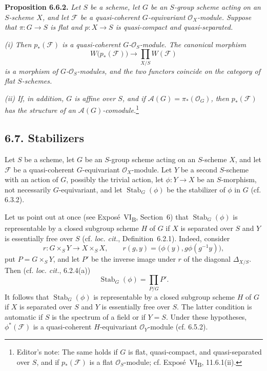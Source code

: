 \medskip
\noindent\textbf{Proposition 6.6.2.}
\textit{Let \(S\) be a scheme, let \(G\) be an \(S\)-group scheme
acting on an \(S\)-scheme \(X\), and let \(\mathcal F\) be a
quasi-coherent \(G\)-equivariant \(\mathcal O_X\)-module. Suppose that
\(\pi:G\to S\) is flat and \(p:X\to S\) is quasi-compact and
quasi-separated.}

\textit{(i) Then \(p_*(\mathcal F)\) is a quasi-coherent
\(G\)-\(\mathcal O_S\)-module. The canonical morphism}
\[
  W\bigl(p_*(\mathcal F)\bigr)
  \longrightarrow\prod_{X/S}W(\mathcal F)
\]
\textit{is a morphism of \(G\)-\(\mathcal O_S\)-modules, and the two
functors coincide on the category of flat \(S\)-schemes.}

\textit{(ii) If, in addition, \(G\) is affine over \(S\), and if
\(\mathscr A(G)=\pi_*(\mathcal O_G)\), then \(p_*(\mathcal F)\) has
the structure of an \(\mathscr A(G)\)-comodule.}\footnote{Editor's
note: The same holds if \(G\) is flat, quasi-compact, and
quasi-separated over \(S\), and if \(p_*(\mathcal F)\) is a flat
\(\mathcal O_S\)-module; cf. Expos\'e~VI\textsubscript{B}, 11.6.1(ii).}

\subsection*{6.7. Stabilizers}

Let \(S\) be a scheme, let \(G\) be an \(S\)-group scheme acting on an
\(S\)-scheme \(X\), and let \(\mathcal F\) be a quasi-coherent
\(G\)-equivariant \(\mathcal O_X\)-module. Let \(Y\) be a second
\(S\)-scheme with an action of \(G\), possibly the trivial action, let
\(\phi:Y\to X\) be an \(S\)-morphism, not necessarily
\(G\)-equivariant, and let \(\operatorname{Stab}_G(\phi)\) be the
stabilizer of \(\phi\) in \(G\) (cf. 6.3.2).

Let us point out at once (see Expos\'e~VI\textsubscript{B},
Section~6) that \(\operatorname{Stab}_G(\phi)\) is representable by a
closed subgroup scheme \(H\) of \(G\) if \(X\) is separated over
\(S\) and \(Y\) is essentially free over \(S\) (cf.
\emph{loc. cit.}, Definition~6.2.1). Indeed, consider
\[
  r:G\times_SY\longrightarrow X\times_SX,
  \qquad
  r(g,y)=\bigl(\phi(y),g\phi(g^{-1}y)\bigr),
\]
put \(P=G\times_SY\), and let \(P'\) be the inverse image under \(r\)
of the diagonal \(\Delta_{X/S}\). Then (cf. \emph{loc. cit.},
6.2.4(a))
\[
  \operatorname{Stab}_G(\phi)=\prod_{P/G}P'.
\]
It follows that \(\operatorname{Stab}_G(\phi)\) is representable by a
closed subgroup scheme \(H\) of \(G\) if \(X\) is separated over
\(S\) and \(Y\) is essentially free over \(S\). The latter condition
is automatic if \(S\) is the spectrum of a field or if \(Y=S\).
Under these hypotheses, \(\phi^*(\mathcal F)\) is a quasi-coherent
\(H\)-equivariant \(\mathcal O_Y\)-module (cf. 6.5.2).

